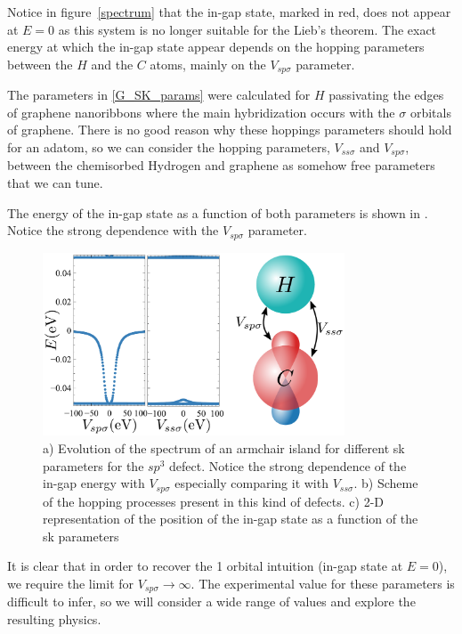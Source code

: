 Notice in figure~\ref{spectrum} that the in-gap state, marked in red, does not appear at $E=0$ as this system is no longer suitable for the Lieb's theorem. The exact energy at which the in-gap state appear depends on the hopping parameters between the $H$ and the $C$ atoms, mainly on the $V_{sp\sigma}$ parameter.




The parameters in \ref{G_SK_params} were calculated for $H$ passivating the edges of graphene nanoribbons\cite{Gosalbez-Martinez2011} where the main hybridization occurs with the $\sigma$ orbitals of graphene. There is no good reason why these hoppings parameters should hold for an adatom, so we can consider the hopping parameters, $V_{ss\sigma}$ and $V_{sp\sigma}$, between the chemisorbed Hydrogen and graphene as somehow free parameters that we can tune.

The energy of the in-gap state as a function of both parameters is shown in . Notice the strong dependence with the $V_{sp\sigma}$ parameter.
\begin{figure}[h!]
  \centering
  \includegraphics[width=0.8\textwidth]{defects/fig/Vsss_Vsps.pdf}
  \vspace{-5pt}
  \caption{a) Evolution of the spectrum of an armchair island for different \ac{sk} parameters for the $sp^3$ defect. Notice the strong dependence of the in-gap energy with $V_{sp\sigma}$ especially comparing it with $V_{ss\sigma}$. b) Scheme of the hopping processes present in this kind of defects. c) 2-D representation of the position of the in-gap state as a function of the \ac{sk} parameters}
\label{ingap}
\end{figure}
\FloatBarrier
It is clear that in order to recover the 1 orbital intuition (in-gap state at $E=0$), we require the limit for $V_{sp\sigma}\to\infty$. The experimental value for these parameters is difficult to infer, so we will consider a wide range of values and explore the resulting physics.


